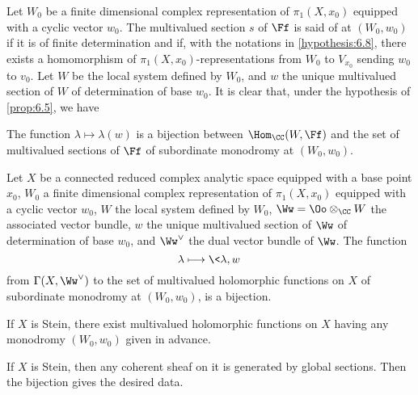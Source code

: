 \begin{para}
  Let $W_0$ be a finite dimensional complex representation of $\pi_1(X,x_0)$
  equipped with a cyclic vector $w_0$. The multivalued section $s$ of $\Ff$ is
  said of  at $(W_0,w_0)$ if it is of finite
  determination and if, with the notations in \ref{hypothesis:6.8}, there exists
  a homomorphism of $\pi_1(X,x_0)$-representations from $W_0$ to $V_{x_0}$
  sending $w_0$ to $v_0$. Let $W$ be the local system defined by $W_0$, and $w$
  the unique multivalued section of $W$ of determination of base $w_0$.
  It is clear that, under the hypothesis of \ref{prop:6.5}, we have
\end{para}
\begin{proposition}
  The function $\lambda\mapsto\lambda(w)$ is a bijection between
  $\Hom_{\CC}(W,\Ff)$ and the set of multivalued sections of $\Ff$ of
  subordinate monodromy at $(W_0,w_0)$.
\end{proposition}
\begin{corollary}
  Let $X$ be a connected reduced complex analytic space
  equipped with a base point $x_0$,
  $W_0$ a finite dimensional complex representation of $\pi_1(X,x_0)$
  equipped with a cyclic vector $w_0$,
  $W$ the local system defined by $W_0$,
  $\Ww=\Oo\otimes_{\CC}W$ the associated vector bundle,
  $w$ the unique multivalued section of $\Ww$ of determination of base $w_0$,
  and $\Ww^{\vee}$ the dual vector bundle of $\Ww$.
  The function
  \[
  \lambda\longmapsto\<\lambda,w\>
  \]
  from $\Gamma(X,\Ww^{\vee})$ to the set of multivalued holomorphic functions
  on $X$ of subordinate monodromy at $(W_0,w_0)$, is a bijection.
\end{corollary}

\begin{corollary}
  If $X$ is Stein, there exist multivalued holomorphic functions on $X$
  having any monodromy $(W_0,w_0)$ given in advance.
\end{corollary}

If $X$ is Stein, then any coherent sheaf on it is generated by global sections.
Then the bijection gives the desired data.

\begin{bibdiv}
\begin{biblist}
\end{biblist}
\end{bibdiv}

